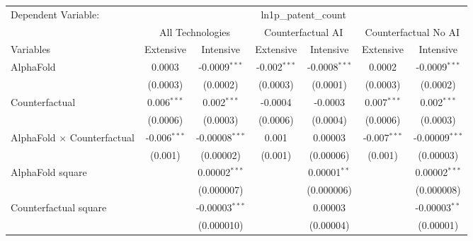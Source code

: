 \begingroup
\centering
\begin{tabular}{lcccccc}
   \tabularnewline \midrule \midrule
   Dependent Variable: & \multicolumn{6}{c}{ln1p\_patent\_count}\\
 & \multicolumn{2}{c}{All Technologies} & \multicolumn{2}{c}{Counterfactual AI} & \multicolumn{2}{c}{Counterfactual No AI} \\
\cmidrule(lr){1-1}\cmidrule(lr){2-3} \cmidrule(lr){4-5} \cmidrule(lr){6-7}
Variables & \multicolumn{1}{c}{Extensive} & \multicolumn{1}{c}{Intensive} & \multicolumn{1}{c}{Extensive} & \multicolumn{1}{c}{Intensive} & \multicolumn{1}{c}{Extensive} & \multicolumn{1}{c}{Intensive} \\
\cmidrule(lr){1-1}\cmidrule(lr){2-2} \cmidrule(lr){3-3} \cmidrule(lr){4-4} \cmidrule(lr){5-5} \cmidrule(lr){6-6} \cmidrule(lr){7-7}
   AlphaFold                          & 0.0003         & -0.0009$^{***}$    & -0.002$^{***}$ & -0.0008$^{***}$ & 0.0002         & -0.0009$^{***}$\\   
                                      & (0.0003)       & (0.0002)           & (0.0003)       & (0.0001)        & (0.0003)       & (0.0002)\\   
   Counterfactual                     & 0.006$^{***}$  & 0.002$^{***}$      & -0.0004        & -0.0003         & 0.007$^{***}$  & 0.002$^{***}$\\   
                                      & (0.0006)       & (0.0003)           & (0.0006)       & (0.0004)        & (0.0006)       & (0.0003)\\   
   AlphaFold $\times$ Counterfactual  & -0.006$^{***}$ & -0.00008$^{***}$   & 0.001          & 0.00003         & -0.007$^{***}$ & -0.00009$^{***}$\\   
                                      & (0.001)        & (0.00002)          & (0.001)        & (0.00006)       & (0.001)        & (0.00003)\\   
   AlphaFold square                   &                & 0.00002$^{***}$    &                & 0.00001$^{**}$  &                & 0.00002$^{***}$\\   
                                      &                & (0.000007)         &                & (0.000006)      &                & (0.000008)\\   
   Counterfactual square              &                & -0.00003$^{***}$   &                & 0.00003         &                & -0.00003$^{**}$\\   
                                      &                & (0.000010)         &                & (0.00004)       &                & (0.00001)\\   

\end{tabular}
